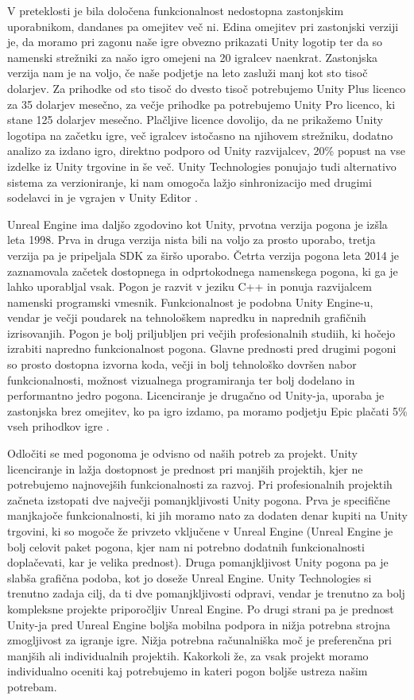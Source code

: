 \documentclass[12pt,a4paper,twoside]{book}
\begin{document}
V preteklosti je bila določena funkcionalnost nedostopna zastonjskim uporabnikom, dandanes pa omejitev več ni. Edina omejitev pri zastonjski verziji je, da moramo pri zagonu naše igre obvezno prikazati Unity logotip ter da so namenski strežniki za našo igro omejeni na 20 igralcev naenkrat. Zastonjska verzija nam je na voljo, če naše podjetje na leto zasluži manj kot sto tisoč dolarjev. Za prihodke od sto tisoč do dvesto tisoč potrebujemo Unity Plus licenco za 35 dolarjev mesečno, za večje prihodke pa potrebujemo Unity Pro licenco, ki stane 125 dolarjev mesečno. Plačljive licence dovolijo, da ne prikažemo Unity logotipa na začetku igre, več igralcev istočasno na njihovem strežniku, dodatno analizo za izdano igro, direktno podporo od Unity razvijalcev, 20\% popust na vse izdelke iz Unity trgovine in še več. Unity Technologies ponujajo tudi alternativo sistema za verzioniranje, ki nam omogoča lažjo sinhronizacijo med drugimi sodelavci in je vgrajen v Unity Editor \cite{unityFeatures}.

Unreal Engine ima daljšo zgodovino kot Unity, prvotna verzija pogona je izšla leta 1998. Prva in druga verzija nista bili na voljo za prosto uporabo, tretja verzija pa je pripeljala SDK za širšo uporabo. Četrta verzija pogona leta 2014 je zaznamovala začetek dostopnega in odprtokodnega namenskega pogona, ki ga je lahko uporabljal vsak. Pogon je razvit v jeziku C++ in ponuja razvijalcem namenski programski vmesnik. Funkcionalnost je podobna Unity Engine-u, vendar je večji poudarek na tehnološkem napredku in naprednih grafičnih izrisovanjih. Pogon je bolj priljubljen pri večjih profesionalnih studiih, ki hočejo izrabiti napredno funkcionalnost pogona. Glavne prednosti pred drugimi pogoni so prosto dostopna izvorna koda, večji in bolj tehnološko dovršen nabor funkcionalnosti, možnost vizualnega programiranja ter bolj dodelano in performantno jedro pogona. Licenciranje je drugačno od Unity-ja, uporaba je zastonjska brez omejitev, ko pa igro izdamo, pa moramo podjetju Epic plačati 5\% vseh prihodkov igre \cite{unrealEngine}. 

Odločiti se med pogonoma je odvisno od naših potreb za projekt. Unity licenciranje in lažja dostopnost je prednost pri manjših projektih, kjer ne potrebujemo najnovejših funkcionalnosti za razvoj. Pri profesionalnih projektih začneta izstopati dve največji pomanjkljivosti Unity pogona. Prva je specifične manjkajoče funkcionalnosti, ki jih moramo nato za dodaten denar kupiti na Unity trgovini, ki so mogoče že privzeto vključene v Unreal Engine (Unreal Engine je bolj celovit paket pogona, kjer nam ni potrebno dodatnih funkcionalnosti doplačevati, kar je velika prednost). Druga pomanjkljivost Unity pogona pa je slabša grafična podoba, kot jo doseže Unreal Engine. Unity Technologies si trenutno zadaja cilj, da ti dve pomanjkljivosti odpravi, vendar je trenutno za bolj kompleksne projekte priporočljiv Unreal Engine. Po drugi strani pa je prednost Unity-ja pred Unreal Engine boljša mobilna podpora in nižja potrebna strojna zmogljivost za igranje igre. Nižja potrebna računalniška moč je preferenčna pri manjših ali individualnih projektih. Kakorkoli že, za vsak projekt moramo individualno oceniti kaj potrebujemo in kateri pogon boljše ustreza našim potrebam.
	
\end{document}
